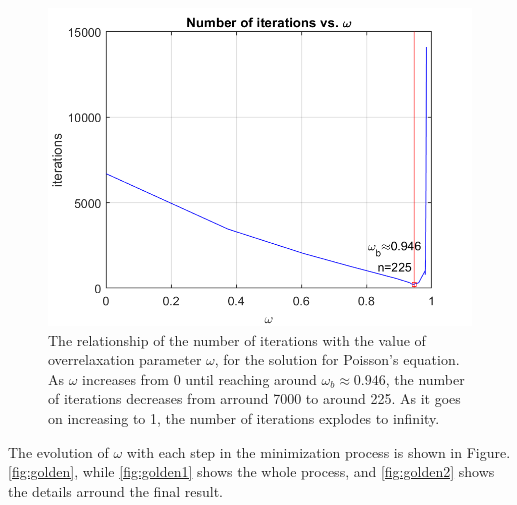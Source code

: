 \documentclass[12pt, graphicx]{article}
\begin{document}
\begin{figure}[ht]
\centering
\includegraphics[width = 120mm]{iteration.png}
\caption{The relationship of the number of iterations with the value of overrelaxation parameter $\omega$, for the solution for Poisson's equation. As $\omega$ increases from 0 until reaching around $\omega_b\approx0.946$, the number of iterations decreases from arround 7000 to around 225. As it goes on increasing to 1, the number of iterations explodes to infinity.}
\label{fig:iteration}
\end{figure}

The evolution of $\omega$ with each step in the minimization process is shown in Figure. \ref{fig:golden}, while \ref{fig:golden1} shows the whole process, and \ref{fig:golden2} shows the details arround the final result. 
\end{document}
